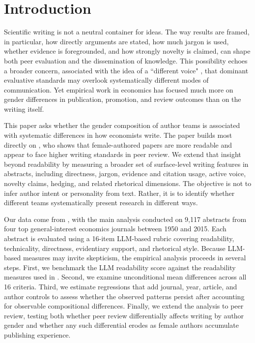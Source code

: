 \section{Introduction}\label{sec:intro}

Scientific writing is not a neutral container for ideas. The way results are framed, in particular, how directly arguments are stated, how much jargon is used, whether evidence is foregrounded, and how strongly novelty is claimed, can shape both peer evaluation and the dissemination of knowledge. This possibility echoes a broader concern, associated with the idea of a ``different voice" \parencite{gilligan1993different}, that dominant evaluative standards may overlook systematically different modes of communication. Yet empirical work in economics has focused much more on gender differences in publication, promotion, and review outcomes than on the writing itself.

This paper asks whether the gender composition of author teams is associated with systematic differences in how economists write. The paper builds most directly on \textcite{hengel2022publishing}, who shows that female-authored papers are more readable and appear to face higher writing standards in peer review. We extend that insight beyond readability by measuring a broader set of surface-level writing features in abstracts, including directness, jargon, evidence and citation usage, active voice, novelty claims, hedging, and related rhetorical dimensions. The objective is not to infer author intent or personality from text. Rather, it is to identify whether different teams systematically present research in different ways.

Our data come from \textcite{hengel2022publishing}, with the main analysis conducted on 9,117 abstracts from four top general-interest economics journals between 1950 and 2015. Each abstract is evaluated using a 16-item LLM-based rubric covering readability, technicality, directness, evidentiary support, and rhetorical style. Because LLM-based measures may invite skepticism, the empirical analysis proceeds in several steps. First, we benchmark the LLM readability score against the readability measures used in \textcite{hengel2022publishing}. Second, we examine unconditional mean differences across all 16 criteria. Third, we estimate regressions that add journal, year, article, and author controls to assess whether the observed patterns persist after accounting for observable compositional differences. Finally, we extend the analysis to peer review, testing both whether peer review differentially affects writing by author gender and whether any such differential erodes as female authors accumulate publishing experience.

